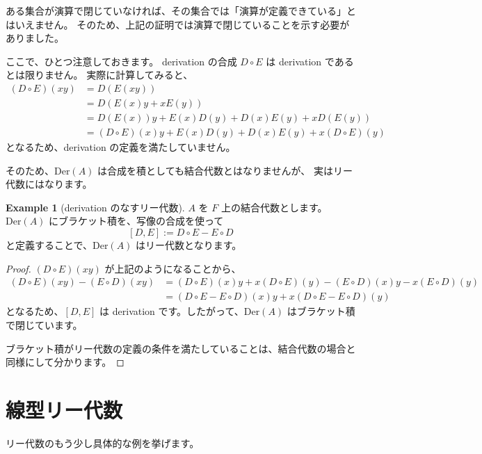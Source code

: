 \documentclass{ltjsarticle}
\theoremstyle{definition}
\newtheorem{example}[definition]{Example}
\begin{document}
ある集合が演算で閉じていなければ、その集合では「演算が定義できている」とはいえません。
そのため、上記の証明では演算で閉じていることを示す必要がありました。

ここで、ひとつ注意しておきます。
derivation の合成 $D \circ E$ は derivation であるとは限りません。
実際に計算してみると、
\begin{align*}
    (D \circ E)(xy) & = D(E(xy))                                                \\
                    & = D(E(x)y + xE(y))                                        \\
                    & = D(E(x))y + E(x)D(y) + D(x)E(y) + xD(E(y))               \\
                    & = (D \circ E)(x)y + E(x)D(y) + D(x)E(y) + x(D \circ E)(y)
\end{align*}
となるため、derivation の定義を満たしていません。

そのため、$\mathrm{Der}(A)$ は合成を積としても結合代数とはなりませんが、
実はリー代数にはなります。

\begin{example}[derivation のなすリー代数]
    $A$ を $F$ 上の結合代数とします。
    $\mathrm{Der}(A)$ にブラケット積を、写像の合成を使って
    \[
        [D, E] := D \circ E - E \circ D
    \]
    と定義することで、$\mathrm{Der}(A)$ はリー代数となります。
\end{example}

\begin{proof}
    $(D \circ E)(xy)$ が上記のようになることから、
    \begin{align*}
        (D \circ E)(xy) - (E \circ D)(xy) & = (D \circ E)(x)y + x(D \circ E)(y) - (E \circ D)(x)y - x(E \circ D)(y) \\
                                          & = (D \circ E - E \circ D)(x)y + x(D \circ E - E \circ D)(y)
    \end{align*}
    となるため、$[D, E]$ は derivation です。したがって、$\mathrm{Der}(A)$ はブラケット積で閉じています。

    ブラケット積がリー代数の定義の条件を満たしていることは、結合代数の場合と同様にして分かります。
\end{proof}

\section{線型リー代数}

リー代数のもう少し具体的な例を挙げます。
\end{document}
